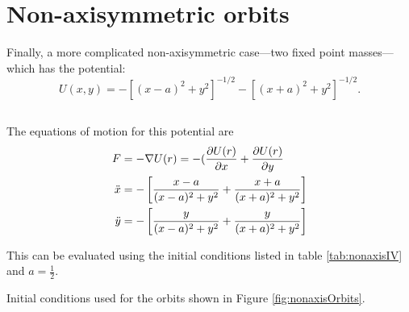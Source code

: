 \section{Non-axisymmetric orbits}

Finally, a more complicated non-axisymmetric case—two fixed point
masses—which has the potential:
\begin{equation}
    U(x,y) = -[(x-a)^2 +y^2]^{-1/2} -[(x+a)^2 +y^2]^{-1/2}.
    \label{eq:non-axisymmetric}
\end{equation}

\subsection{}

The equations of motion for this potential are
\begin{align*}
    F&=-\nabla U(r) =-(\frac{\partial U(r)}{\partial x}+\frac{\partial U(r)}{\partial y}\\
    \Ddot{x}&=-\left[\frac{x-a}{(x-a)^2+y^2}+\frac{x+a}{(x+a)^2+y^2}\right] \\
    \Ddot{y}&=- \left[\frac{y}{(x-a)^2+y^2}+\frac{y}{(x+a)^2+y^2}\right]
\end{align*}

This can be evaluated using the initial conditions listed in table \ref{tab:nonaxisIV} and $a= \frac{1}{2}$.


\begin{table}[]
    \centering

    \caption{Initial conditions used for the orbits shown in Figure \ref{fig:nonaxisOrbits}.}
    \label{tab:nonaxisIV}
\end{table}

